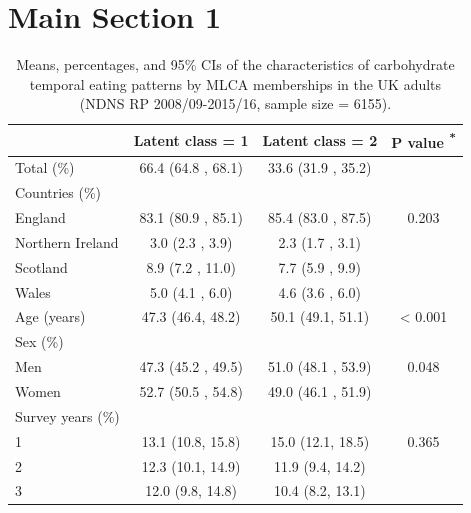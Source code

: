 \section{Main Section 1}


\begin{table}[h]
	\caption{\label{tab:MLCAtab1}Means, percentages, and 95\% CIs of the characteristics  of carbohydrate temporal eating patterns by MLCA memberships in the UK adults (NDNS RP 2008/09-2015/16, sample size = 6155).}\vspace{-0.3cm}
		\centering
		\fontsize{9}{10}\selectfont
		\begin{tabular}[t]{lccc}
			\hiderowcolors
			\toprule
			 & Latent class = 1 & Latent class = 2 & P value \textsuperscript{*}\\
			\midrule
			\showrowcolors
			Total (\%) & 66.4  (64.8 , 68.1) & 33.6  (31.9 , 35.2) & \\
			Countries (\%) &  &  & \\
			\hspace{1em}England & 83.1  (80.9 , 85.1) & 85.4  (83.0 , 87.5) & 0.203\\
			\hspace{1em}Northern Ireland & 3.0  (2.3 , 3.9) & 2.3  (1.7 , 3.1) & \\
			\hspace{1em}Scotland & 8.9  (7.2 , 11.0) & 7.7  (5.9 , 9.9) & \\
			\hspace{1em}Wales & 5.0  (4.1 , 6.0) & 4.6  (3.6 , 6.0) & \\
			Age (years) & 47.3 (46.4, 48.2) & 50.1 (49.1, 51.1) & < 0.001\\
			Sex (\%) &  &  & \\
			\hspace{1em}Men & 47.3  (45.2 , 49.5) & 51.0  (48.1 , 53.9) & 0.048\\
			\hspace{1em}Women & 52.7  (50.5 , 54.8) & 49.0  (46.1 , 51.9) & \\
			Survey years (\%) &  &  & \\
			\hspace{1em}1 & 13.1 (10.8, 15.8) & 15.0 (12.1, 18.5) & 0.365\\
			\hspace{1em}2 & 12.3 (10.1, 14.9) & 11.9 (9.4, 14.2) & \\
			\hspace{1em}3 & 12.0 (9.8, 14.8) & 10.4 (8.2, 13.1) & \\

\end{tabular}
\end{table}
